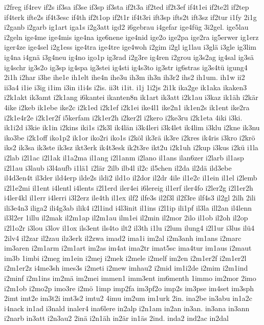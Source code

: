 {i2freg
if4rev
if2s
if3sa
if3se
if3sp
if3sta
if2t3a
if2ted
if2t3ef
if4t1ei
if2te2l
if2tep
if4terk
ifte2s
if4t3esc
if4th
if2t1op
if2t1r
if4t3ri
ift3sp
ifts2t
ift3sz
if2tur
i1fy
2i1g
i2ganb
i2garb
ig1art
iga1s
i2g3att
igd2
i6gebrau
i4gefar
ige4füg
3i2gel.
ige5lau
i2geln
ige4me
ige4mis
ige4na
ige6nene
ige4nid
ige2o
ige2pa
ige2ra
ig5erwer
ig1erz
iger4ze
ige4sel
i2g1ess
ige4tra
ige4tre
ige4woh
i2gim
i2gl
ig1lau
i3glä
i3gle
ig3lim
ig4na
i4gnä
i3g4neu
ig4no
igo1p
ig3rad
i2g3re
ig4ren
i2grou
ig3s2ag
ig4sal
ig3sä
ig4schr
ig3s2o
ig3sp
ig4spa
ig3stei
ig4sti
ig4s3to
ig3str
ig6stras
ig3s4tü
igung4
2i1h
i2har
i3he
ihe1e
ih1elt
ihe4n
ihe3u
ih3m
ih3n
ih3r2
ihs2
ih1um.
ih1w
ii2
ii3a4
i1ie
i3ig
i1im
i3in
i1i4s
i2is.
ii3t
i1it.
i1j
1i2js
2i1k
ika2ge
ik1aka
ikaken3
i2k1akt
ik3amt
i2k1ang
i6kantei
ikanten8n
ik1art
ik3att
i2k1au
i3kaz
ik1äh
i2kär
4ike
i2keb
ik1ebe
ike2c
i2k1ed
i2k1ef
i2k1ei
ike4l1
ike2n1
ik1en2s
ik1ent
ike2ra
i2k1e4r2e
i2k1er2f
i5kerfam
i2k1er2h
i2ker2l
i2kero
i2ke3ru
i2k1eta
4iki
i3ki.
ik1i2d
i3kie
ik1in
i2kins
iki1s
i2k3l
ik4län
i3k4leri
i3k4let
ik4lim
i3klu
i2kne
ik3nu
iko3be
i2k1off
iko1p2
ik1or
iko2ri
iko1s
i2köl
ik3rä
ik3re
i2kres
ik4ris
i3kro
i2krö
iks2
ik3sa
ik3ste
ik3sz
ikt3erk
ik4t3esk
ik2t3re
ikt2u
i2k1uh
i2kup
i3kus
i2kü
i1la
i2lab
i2l1ac
i2l1ak
il1a2ma
il1ang
i2l1anm
i2lano
il1ans
ilan6zer
i2larb
il1asp
i2l1au
i3laub
i3l4aufb
i1lä1
i2lär
2ilb
ilb4l
il2c
il5chen
il2da
il2dä
ild3ebe
il4d3en4t
il3der
ild4erp
ilde2s
ildi2
ild1o
il2dor
il2dr
4ile
il1e2c
il1ein
il1el
i2lemb
i2l1e2mi
il1ent
i4lentl
i4lents
i2l1erd
iler4ei
i6lereig
il1erf
iler4fo
i2ler2g
i2l1er2h
i4ler4kl
il1err
i4lerri
i3l2erz
ile4th
il1ex
ilf2
ilfe3s
il2f3l
il2f3re
ilf4s3
il2gl
2ilh
2ili
ili3e4n3
iliga2
ili4g3ab
ilik4
i2l1ind
i4l3init
il1ins
i2l1ip
ili1pf
il3la
ill2an
il4lenn
il3l2er
1illu
il2mak
il2m1ap
il2m1au
ilm1ei
il2min
il2mor
2ilo
il1ob
il2oh
il2op
i2l1o2r
i3lou
i3lov
il1ox
ils3ent
ils4to
ilt2
il3th
i1lu
i2lum
ilung4
i2l1ur
i3lus
ilü4
2ilv4
il2zar
il2zau
ilz3erk
il2zwa
imad2
ima1i
im2al
i2m3anh
im1ans
i2marc
im3aren
i2m1arm
i2m1art
im2as
im4at
ima2tr
imat5sc
ima4tur
im1aus
i2maut
im3b
1imbi
i2meg
im1ein
i2mej
i2mek
i2mele
i2melf
im2en
i2m1er2f
i2m1er2l
i2m1er2z
i4me3sh
imes3s
i2meti
i2mew
imhau2
i2mid
im1i2de
i2mim
i2m1ind
i2minf
i2m1ins
im2mä
im2mei
immen1
imm3ent
im6menth
1immo
im2mor
2imo
i2m1ob
i2mo2p
imo3re
i2mö
1imp
imp2fa
im3pf2o
imp2s
im3pse
im4set
im3sph
2imt
imt2e
im3t2i
imt3s2
imtu2
4imu
im2um
im1urk
2in.
ina2be
in3abu
in1a2c
i4nack
in1ad
i3nald
inaler4
ina6lere
in2alp
i2n1am
in2an
in3an.
in3ana
in3ann
i2narb
in3att
i2n3au2
2inä
i2n1äh
in2är
in1äs
2ind.
inda2
ind2ac
in2dal
}
